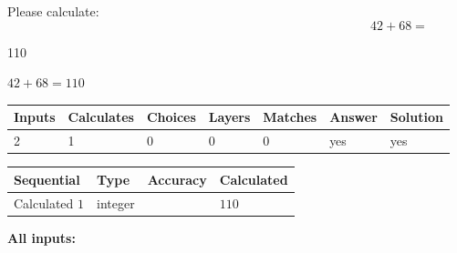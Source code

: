 \documentclass[12pt]{article}
\begin{document}
Please calculate:
\begin{equation}
42 +  %
68 = \nonumber
\end{equation}
 
 
 
\noindent{}
 
 

110
 
 
\noindent{}
 
 

 
 
 
\noindent{}
 
 

$ %
42 +  %
68=   %
110$
 
 
\noindent{}
 
 

 
   
   
   
   
\noindent\begin{tabular}{|l|l|l|l|l|l|l|}
 \hline
Inputs & Calculates & Choices & Layers & Matches & Answer & Solution \\ \hline
 2  & 
 1  & 
 0
  & 
 0  & 
 0  & 
  yes & 
  yes 
  \\ \hline
 \end{tabular}
   
   
   
   
\noindent{}
   
   
  
  
\noindent\begin{tabular}{|l|l|l|l|}
\hline
 Sequential & Type & Accuracy & Calculated \\ 
\hline
 
 
  Calculated $  1 $ & integer &  & 
  $ 110 $ 
 \\  \hline  
 \end{tabular}
   
   
   
   
\noindent\vspace{0.1in}\hspace{-0.08in} {\textbf{\Large{All inputs: }}}
   
   
  
\end{document}
